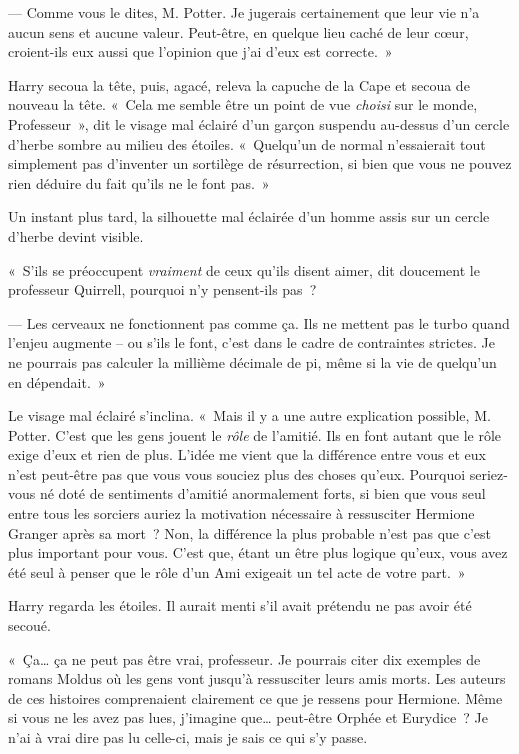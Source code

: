--- Comme vous le dites, M. Potter.
Je jugerais certainement que leur vie n'a aucun sens et aucune valeur.
Peut-être, en quelque lieu caché de leur cœur, croient-ils eux aussi que l'opinion que j'ai d'eux est correcte.~»

Harry secoua la tête, puis, agacé, releva la capuche de la Cape et secoua de nouveau la tête.
«~Cela me semble être un point de vue \emph{choisi} sur le monde, Professeur~», dit le visage mal éclairé d'un garçon suspendu au-dessus d'un cercle d'herbe sombre au milieu des étoiles.
«~Quelqu'un de normal n'essaierait tout simplement pas d'inventer un sortilège de résurrection, si bien que vous ne pouvez rien déduire du fait qu'ils ne le font pas.~»

Un instant plus tard, la silhouette mal éclairée d'un homme assis sur un cercle d'herbe devint visible.

«~S'ils se préoccupent \emph{vraiment} de ceux qu'ils disent aimer, dit doucement le professeur Quirrell, pourquoi n'y pensent-ils pas~?

--- Les cerveaux ne fonctionnent pas comme ça.
Ils ne mettent pas le turbo quand l'enjeu augmente -- ou s'ils le font, c'est dans le cadre de contraintes strictes.
Je ne pourrais pas calculer la millième décimale de pi, même si la vie de quelqu'un en dépendait.~»

Le visage mal éclairé s'inclina.
«~Mais il y a une autre explication possible, M. Potter.
C'est que les gens jouent le \emph{rôle} de l'amitié.
Ils en font autant que le rôle exige d'eux et rien de plus.
L'idée me vient que la différence entre vous et eux n'est peut-être pas que vous vous souciez plus des choses qu'eux.
Pourquoi seriez-vous né doté de sentiments d'amitié anormalement forts, si bien que vous seul entre tous les sorciers auriez la motivation nécessaire à ressusciter Hermione Granger après sa mort~?
Non, la différence la plus probable n'est pas que c'est plus important pour vous.
C'est que, étant un être plus logique qu'eux, vous avez été seul à penser que le rôle d'un Ami exigeait un tel acte de votre part.~»

Harry regarda les étoiles.
Il aurait menti s'il avait prétendu ne pas avoir été secoué.

«~Ça… ça ne peut pas être vrai, professeur.
Je pourrais citer dix exemples de romans Moldus où les gens vont jusqu'à ressusciter leurs amis morts.
Les auteurs de ces histoires comprenaient clairement ce que je ressens pour Hermione.
Même si vous ne les avez pas lues, j'imagine que… peut-être Orphée et Eurydice~?
Je n'ai à vrai dire pas lu celle-ci, mais je sais ce qui s'y passe.

